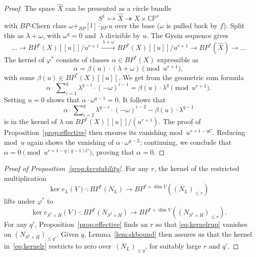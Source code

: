 \documentclass[11pt, reqno]{amsart}
\theoremstyle{plain}
\theoremstyle{definition}
\DeclareMathOperator*{\gplus}{+}
\DeclareMathOperator*{\gdot}{\cdot}
\begin{document}
\begin{proof}
The space $\hat{X}$ can be presented as a circle bundle 
\[
S^1  \rightarrowtail  \hat{X} \twoheadrightarrow 
X\times \mathbb{CP}^r
\]
with $BP$-Chern class $\omega \gplus_{BP} [l]\gdot_{BP}u $ over the base ($\omega$ is pulled back by $f$). Split this as 
$\lambda + \omega $, with $\omega^q=0$ and~$\lambda$ divisible by $u$. The Gysin sequence gives  
\begin{equation}
\dots \to BP^*(X)[[u]]/u^{r+1}	\xrightarrow
	{\ \lambda +\omega\ }
	BP^*(X)[[u]]/u^{r+1} \to  BP^*(\hat{X})\to \dots
\end{equation}
The kernel of $\varphi^*$ consists of classes $\alpha\in BP^*(X)$ expressible as 
\[
\alpha= \beta(u)\cdot(\lambda +\omega)\pmod{u^{r+1}}, 
\]
with some $\beta(u)\in BP^*(X)[[u]]$. We get from the geometric sum formula
\[
\alpha\cdot \sum\nolimits_{i=1}^q 	\lambda^{q-i}\cdot 
	(-\omega)^{i-1} = \beta(u)\cdot\lambda^q  \pmod{u^{r+1}}.
\]
Setting $u=0$ shows that $\alpha\cdot \omega^{q-1}=0$. 
It follows that
\[
\alpha\cdot \sum\nolimits_{i=2}^q 	\lambda^{q-i}\cdot 
	(-\omega)^{i-2} 
	- \beta(u)\cdot\lambda^{q-1}
\]
is in the kernel of $\lambda$ on $BP^*(X)[[u]]/(u^{r+1})$.  The proof of Proposition~\ref{prop:effective} 
then ensures its vanishing mod~$u^{r+1-qC}$. Reducing mod~$u$ again shows the vanishing of 
$\alpha\cdot \omega^{q-2}$; continuing, we conclude that 
$\alpha=0 \pmod{u^{r+1-q(q-1)C}}$, proving that $\alpha=0$.  
\end{proof}

\begin{proof}[Proof of Proposition~\ref{prop:kerstability}]
For any $r$, the kernel of the restricted 
multiplication
\begin{equation} \label{eq:kernelr}
\ker e_L(V)\cdot: BP^*\left(N_L\right) \to 
	BP^{*+\dim V}\left((N_L)_{\le r}\right)
\end{equation}
lifts under $\varphi^*$ to
\begin{equation} \label{eq:kernelrup}
\ker e_{S^1\times H}(V)\cdot: BP^*\left(N_{S^1\times H}\right) \to 
BP^ {*+\dim V}\left((N_{S^1\times H})_{\le r}\right). 
\end{equation}
For any $q'$,  Proposition~\ref {prop:effective} 
finds an $r$ so that \eqref {eq:kernelrup} vanishes on $(N_{S^1\times H})_{\le q'}$. 
Given $q$, Lemma~\ref {lem:skbound} then assures us that the kernel in~\eqref {eq:kernelr}  restricts to zero 
over~$(N_L)_{\le q}$, for suitably large $r$ and $q'$. 
\end{proof}
\end{document}
